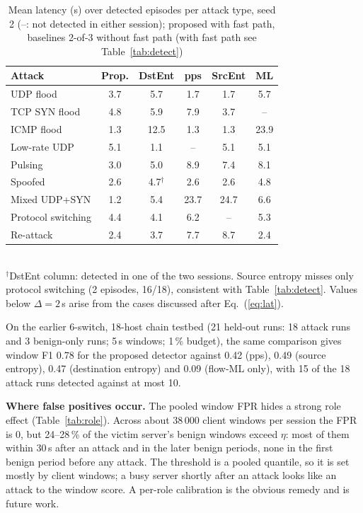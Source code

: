 \documentclass[conference]{IEEEtran}
\begin{document}
\begin{table}[t]
\caption{Mean latency (s) over detected episodes per attack type, seed 2 (--: not detected in either session); proposed with fast path, baselines 2-of-3 without fast path (with fast path see Table~\ref{tab:detect})}
\label{tab:types}
\centering
\setlength{\tabcolsep}{3pt}
\begin{tabular}{lccccc}
\toprule
Attack & Prop. & DstEnt & pps & SrcEnt & ML \\
\midrule
UDP flood & 3.7 & 5.7 & 1.7 & 1.7 & 5.7 \\
TCP SYN flood & 4.8 & 5.9 & 7.9 & 3.7 & -- \\
ICMP flood & 1.3 & 12.5 & 1.3 & 1.3 & 23.9 \\
Low-rate UDP & 5.1 & 1.1 & -- & 5.1 & 5.1 \\
Pulsing & 3.0 & 5.0 & 8.9 & 7.4 & 8.1 \\
Spoofed & 2.6 & 4.7$^\dagger$ & 2.6 & 2.6 & 4.8 \\
Mixed UDP+SYN & 1.2 & 5.4 & 23.7 & 24.7 & 6.6 \\
Protocol switching & 4.4 & 4.1 & 6.2 & -- & 5.3 \\
Re-attack & 2.4 & 3.7 & 7.7 & 8.7 & 2.4 \\
\bottomrule
\end{tabular}\\[2pt]
\footnotesize $^\dagger$DstEnt column: detected in one of the two sessions. Source entropy misses only protocol switching (2 episodes, 16/18), consistent with Table~\ref{tab:detect}. Values below $\Delta=2$\,s arise from the cases discussed after Eq.~(\ref{eq:lat}).
\end{table}

On the earlier 6-switch, 18-host chain testbed (21 held-out runs: 18 attack runs and 3 benign-only runs; 5\,s windows; 1\,\% budget), the same comparison gives window F1 0.78 for the proposed detector against 0.42 (pps), 0.49 (source entropy), 0.47 (destination entropy) and 0.09 (flow-ML only), with 15 of the 18 attack runs detected against at most 10.

\textbf{Where false positives occur.} The pooled window FPR hides a strong role effect (Table~\ref{tab:role}). Across about 38\,000 client windows per session the FPR is 0, but 24--28\,\% of the victim server's benign windows exceed $\eta$: most of them within 30\,s after an attack and in the later benign periods, none in the first benign period before any attack. The threshold is a pooled quantile, so it is set mostly by client windows; a busy server shortly after an attack looks like an attack to the window score. A per-role calibration is the obvious remedy and is future work.
\end{document}
